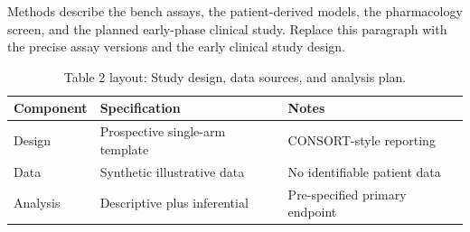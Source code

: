 
Methods describe the bench assays, the patient-derived models, the pharmacology screen, and the planned early-phase clinical study. Replace this paragraph with the precise assay versions and the early clinical study design.

\begin{table}[H]
\caption{Table 2 layout: Study design, data sources, and analysis plan.}
\label{tab:methods_design}
\centering
\begin{tabular}{>{\raggedright\arraybackslash}p{3.4cm} >{\raggedright\arraybackslash}p{4.6cm} >{\raggedright\arraybackslash}p{5.4cm}}
\toprule
\textbf{Component} & \textbf{Specification} & \textbf{Notes} \\
\midrule
  Design & Prospective single-arm template & CONSORT-style reporting \\
  Data & Synthetic illustrative data & No identifiable patient data \\
  Analysis & Descriptive plus inferential & Pre-specified primary endpoint \\
\bottomrule
\end{tabular}
\end{table}
